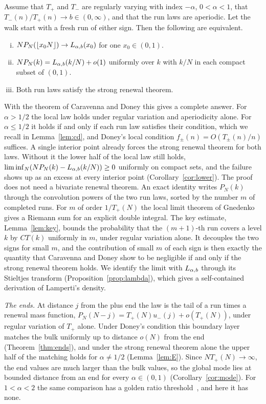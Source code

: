 \begin{introtheorem}\label{thm:local}
Assume that $T_\plus$ and $T_\minus$ are regularly varying with index $-\alpha$,
$0<\alpha<1$, that $T_\minus(n)/T_\plus(n)\to b\in(0,\infty)$, and that the run laws
are aperiodic. Let the walk start with a fresh run of either sign. Then the
following are equivalent.
\begin{enumerate}[(i)]
\item $NP_N(\lfloor x_0N\rfloor)\to L_{\alpha,b}(x_0)$ for one $x_0\in(0,1)$.
\item $NP_N(k)=L_{\alpha,b}(k/N)+o(1)$ uniformly over $k$ with $k/N$ in each compact
subset of $(0,1)$.
\item Both run laws satisfy the strong renewal theorem.
\end{enumerate}
\end{introtheorem}

With the theorem of Caravenna and Doney this gives a complete answer. For $\alpha>1/2$ the
local law holds under regular variation and aperiodicity alone. For $\alpha\le1/2$ it holds
if and only if each run law satisfies their condition, which we recall in
Lemma~\ref{lem:cd}, and Doney's local condition $f_\pm(n)=O(T_\pm(n)/n)$ suffices. A single
interior point already forces the strong renewal theorem for both laws. Without it the lower
half of the local law still holds, $\liminf_N(NP_N(k)-L_{\alpha,b}(k/N))\ge0$ uniformly on compact
sets, and the failure shows up as an excess at every interior point
(Corollary~\ref{cor:lower}). The proof does not need a bivariate renewal theorem. An exact
identity writes $P_N(k)$ through the convolution powers of the two run laws, sorted by the
number $m$ of completed runs. For $m$ of order $1/T_\plus(N)$ the local limit theorem of
Gnedenko gives a Riemann sum for an explicit double integral. The key estimate,
Lemma~\ref{lem:key}, bounds the probability that the $(m+1)$-th run covers a level $k$ by
$CT(k)$ uniformly in $m$, under regular variation alone. It decouples the two signs for small
$m$, and the contribution of small $m$ of each sign is then exactly the quantity that
Caravenna and Doney show to be negligible if and only if the strong renewal theorem holds.
We identify the limit with $L_{\alpha,b}$ through its Stieltjes transform
(Proposition~\ref{prop:lambda}), which gives a self-contained derivation of Lamperti's density.

\emph{The ends.} At distance $j$ from the plus end the law is the tail of a run times a
renewal mass function, $P_N(N-j)=T_\plus(N)u_\minus(j)+o(T_\plus(N))$, under regular variation
of $T_\plus$ alone. Under Doney's condition this boundary layer matches the bulk uniformly up
to distance $o(N)$ from the end (Theorem~\ref{thm:ends}), and under the strong renewal theorem
alone the upper half of the matching holds for $\alpha\ne1/2$ (Lemma~\ref{lem:E}). Since
$NT_\plus(N)\to\infty$, the end values are much larger than the bulk values, so the global mode
lies at bounded distance from an end for every $\alpha\in(0,1)$ (Corollary~\ref{cor:mode}).
For $1<\alpha<2$ the same comparison has a golden ratio threshold~\cite{paperF}, and here it
has none.

